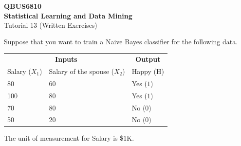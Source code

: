 \documentclass[12pt]{exam}
\def\({\left(}
\def\){\right)}
\begin{document}
\begin{center}
{\Large \textbf{QBUS6810} \\\textbf{Statistical Learning and Data Mining}}\\  \large{Tutorial 13 (Written Exercises)}
\end{center}




\begin{questions}

\question

Suppose that you want to train a Naive Bayes classifier for the following data.

\medskip

\begin{center}
\begin{tabular}{ll|l}
\toprule
\multicolumn{2}{c}{\textbf{Inputs}}      &          \multicolumn{1}{c}{\textbf{Output}}   \\
\multicolumn{1}{c}{Salary ($X_1$)} & \multicolumn{1}{c}{Salary of the spouse ($X_2$)} & \multicolumn{1}{c}{Happy (H)}\\ \midrule
80          & 60         & Yes ($1$)    \\
100          & 80         & Yes ($1$)    \\
70          & 80   & No ($0$)   \\
50          & 20   & No ($0$)   \\ \bottomrule
\end{tabular}
\end{center}

\medskip

The unit of measurement for Salary is \$1K.

\bigskip

\end{questions}
\end{document}
